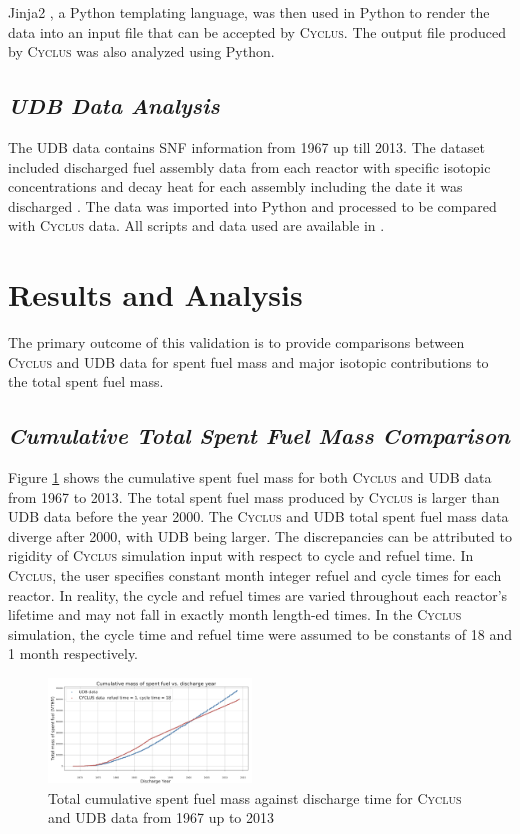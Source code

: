\documentclass{anstrans}
\newcommand{\Cyclus}{\textsc{Cyclus}\xspace}%
\begin{document}
Jinja2 \cite{Ronacher_Jinja2_2018}, a Python templating language, was then used in Python to render the data into an input file that can be accepted by \Cyclus. The output file produced by \Cyclus was also analyzed using Python. 


\subsection{\textit{UDB Data Analysis}}
The UDB data contains SNF information from 1967 up till 2013. The dataset included discharged fuel assembly data from each reactor with specific isotopic concentrations and decay heat for each assembly including the date it was discharged \cite{Peterson_UNF_2017}. The data was imported into Python and processed to be compared with \Cyclus data. All scripts and data used are available in \cite{doi_transition_scenarios}. 
\section{Results and Analysis}
The primary outcome of this validation is to provide comparisons between \Cyclus and UDB data for spent fuel mass and major isotopic contributions to the total spent fuel mass. 

\subsection{\textit{Cumulative Total Spent Fuel Mass Comparison}}
Figure \ref{fig:total_original} shows the cumulative spent fuel mass for both \Cyclus and UDB data from 1967 to 2013. The total spent fuel mass produced by \Cyclus is larger than UDB data before the year 2000. The \Cyclus and UDB total spent fuel mass data diverge after 2000, with UDB being larger. The discrepancies can be attributed to rigidity of \Cyclus simulation input with respect to cycle and refuel time. In \Cyclus, the user specifies constant month integer refuel and cycle times for each reactor. In reality, the cycle and refuel times are varied throughout each reactor's lifetime and may not fall in exactly month length-ed times. In the \Cyclus simulation, the cycle time and refuel time were assumed to be constants of 18 and 1 month respectively.   

\begin{figure}[ht] %
	\centering
	\includegraphics[width=0.48\textwidth]{total_cumulative_mass_spent_fuel_original}
	\caption{Total cumulative spent fuel mass against discharge time for \Cyclus and UDB data from 1967 up to 2013}
	\label{fig:total_original}
\end{figure}
\end{document}
